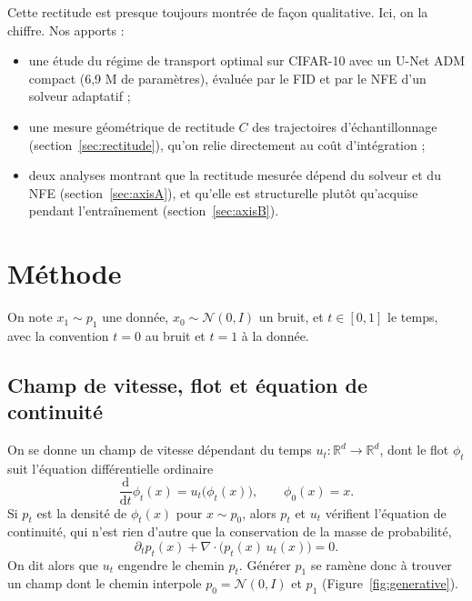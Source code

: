 \documentclass[11pt]{article}
\begin{document}
Cette rectitude est presque toujours montrée de façon qualitative. Ici, on la chiffre. Nos apports :
\begin{itemize}\setlength\itemsep{0.15em}
\item une étude du régime de transport optimal sur CIFAR-10 avec un U-Net ADM compact (6,9 M de paramètres),
  évaluée par le FID et par le NFE d'un solveur adaptatif ;
\item une mesure géométrique de rectitude $C$ des trajectoires d'échantillonnage (section~\ref{sec:rectitude}),
  qu'on relie directement au coût d'intégration ;
\item deux analyses montrant que la rectitude mesurée dépend du solveur et du NFE (section~\ref{sec:axisA}), et
  qu'elle est structurelle plutôt qu'acquise pendant l'entraînement (section~\ref{sec:axisB}).
\end{itemize}

\section{Méthode}
\label{sec:methode}

On note $x_1 \sim p_1$ une donnée, $x_0 \sim \mathcal{N}(0,I)$ un bruit, et $t \in [0,1]$ le temps, avec la
convention $t{=}0$ au bruit et $t{=}1$ à la donnée.

\subsection{Champ de vitesse, flot et équation de continuité}
\label{sec:continuity}

On se donne un champ de vitesse dépendant du temps $u_t : \mathbb{R}^d \to \mathbb{R}^d$, dont le flot
$\phi_t$ suit l'équation différentielle ordinaire
\begin{equation}
\frac{\mathrm{d}}{\mathrm{d}t}\phi_t(x) = u_t\big(\phi_t(x)\big), \qquad \phi_0(x) = x.
\label{eq:ode}
\end{equation}
Si $p_t$ est la densité de $\phi_t(x)$ pour $x \sim p_0$, alors $p_t$ et $u_t$ vérifient l'équation de
continuité, qui n'est rien d'autre que la conservation de la masse de probabilité,
\begin{equation}
\partial_t p_t(x) + \nabla \!\cdot\! \big(p_t(x)\, u_t(x)\big) = 0.
\label{eq:continuity}
\end{equation}
On dit alors que $u_t$ engendre le chemin $p_t$. Générer $p_1$ se ramène donc à trouver un champ dont le
chemin interpole $p_0 = \mathcal{N}(0,I)$ et $p_1$ (Figure~\ref{fig:generative}).
\end{document}
